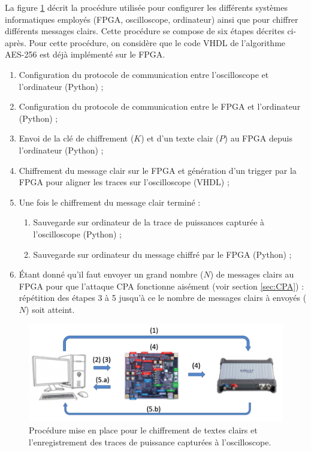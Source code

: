 \documentclass[oneside]{book}
\begin{document}
\hspace{-0.5cm}La figure \ref{fig:procedure_1} décrit la procédure utilisée pour configurer les différents systèmes informatiques employés (FPGA, oscilloscope, ordinateur) ainsi que pour chiffrer différents messages clairs. Cette procédure se compose de six étapes décrites ci-après. Pour cette procédure, on considère que le code VHDL de l'algorithme AES-256 est déjà implémenté sur le FPGA. 
\begin{enumerate}
\item Configuration du protocole de communication entre l'oscilloscope et l'ordinateur (Python)  ;
\item Configuration du protocole de communication entre le FPGA et l'ordinateur (Python) ;
\item Envoi de la clé de chiffrement ($K$) et d'un texte clair ($P$) au FPGA depuis l'ordinateur (Python)  ;
\item Chiffrement du message clair sur le FPGA et génération d'un trigger par la FPGA pour aligner les traces sur l'oscilloscope (VHDL) ;
\item Une fois le chiffrement du message clair terminé :
\begin{enumerate}
\item Sauvegarde sur ordinateur de la trace de puissances capturée à l'oscilloscope (Python) ;
\item Sauvegarde sur ordinateur du message chiffré par le FPGA (Python) ;
\end{enumerate}
\item Étant donné qu'il faut envoyer un grand nombre ($N$) de messages clairs au FPGA pour que l'attaque CPA fonctionne aisément (voir section \ref{sec:CPA}) : répétition des étapes 3 à 5 jusqu'à ce le nombre de messages clairs à envoyés ($N$) soit atteint.
\end{enumerate}

\begin{figure}[htbp]
    \centering
    \includegraphics[scale=0.53]{image/procedure_1}
    \caption{Procédure mise en place pour le chiffrement de textes clairs et l'enregistrement des traces de puissance capturées à l'oscilloscope.}
    \label{fig:procedure_1} 
\end{figure}
\end{document}
